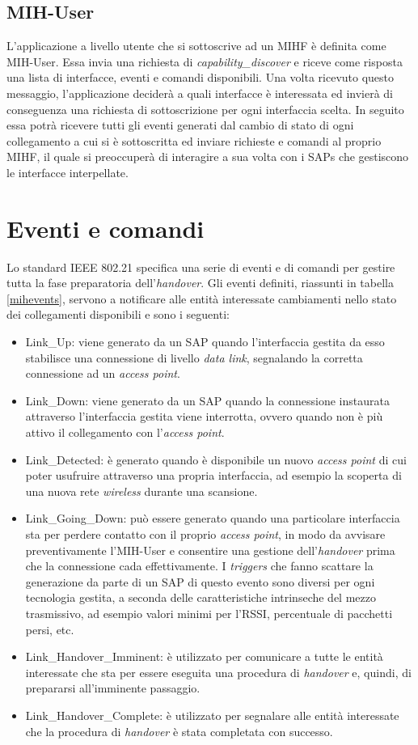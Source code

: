 \subsection{MIH-User}
L'applicazione a livello utente che si sottoscrive ad un MIHF è definita come MIH-User. Essa invia una richiesta di {\em capability\_discover} e riceve come risposta una lista di interfacce, eventi e comandi disponibili. Una volta ricevuto questo messaggio, l'applicazione deciderà a quali interfacce è interessata ed invierà di conseguenza una richiesta di sottoscrizione per ogni interfaccia scelta. In seguito essa potrà ricevere tutti gli eventi generati dal cambio di stato di ogni collegamento a cui si è sottoscritta ed inviare richieste e comandi al proprio MIHF, il quale si preoccuperà di interagire a sua volta con i SAPs che gestiscono le interfacce interpellate.

\section{Eventi e comandi}
Lo standard IEEE 802.21 specifica una serie di eventi e di comandi per gestire tutta la fase preparatoria dell'{\em handover}. Gli eventi definiti, riassunti in tabella \ref{mihevents}, servono a notificare alle entità interessate cambiamenti nello stato dei collegamenti disponibili e sono i seguenti:
\begin{itemize}
\item Link\_Up: viene generato da un SAP quando l'interfaccia gestita da esso stabilisce una connessione di livello {\em data link}, segnalando la corretta connessione ad un {\em access point}.
\item Link\_Down: viene generato da un SAP quando la connessione instaurata attraverso l'interfaccia gestita viene interrotta, ovvero quando non è più attivo il collegamento con l'{\em access point}.
\item Link\_Detected: è generato quando è disponibile un nuovo {\em access point} di cui poter usufruire attraverso una propria interfaccia, ad esempio la scoperta di una nuova rete {\em wireless} durante una scansione.
\item Link\_Going\_Down: può essere generato quando una particolare interfaccia sta per perdere contatto con il proprio {\em access point}, in modo da avvisare preventivamente l'MIH-User e consentire una gestione dell'{\em handover} prima che la connessione cada effettivamente. I {\em triggers} che fanno scattare la generazione da parte di un SAP di questo evento sono diversi per ogni tecnologia gestita, a seconda delle caratteristiche intrinseche del mezzo trasmissivo, ad esempio valori minimi per l'RSSI, percentuale di pacchetti persi, etc.
\item Link\_Handover\_Imminent: è utilizzato per comunicare a tutte le entità interessate che sta per essere eseguita una procedura di {\em handover} e, quindi, di prepararsi all'imminente passaggio.
\item Link\_Handover\_Complete: è utilizzato per segnalare alle entità interessate che la procedura di {\em handover} è stata completata con successo.
\end{itemize}

